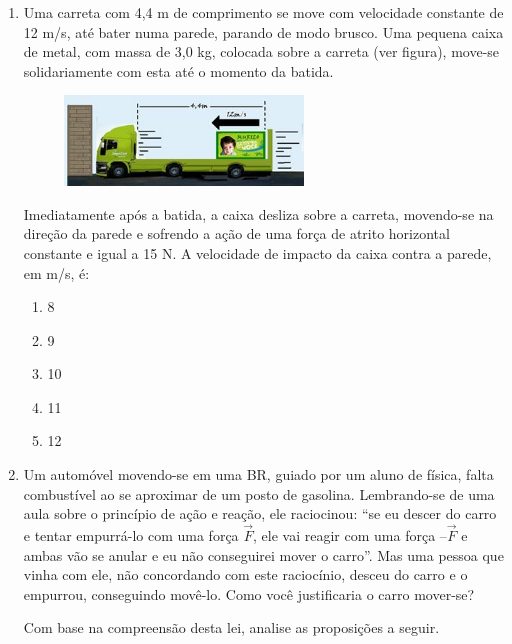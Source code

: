 \documentclass[12pt,letterpaper,fleqn]{article}
\begin{document}
\begin{enumerate}
\item Uma carreta com 4,4 m de comprimento se move com velocidade constante de 12 m/s, até bater numa parede,
parando de modo brusco. Uma pequena caixa de metal, com massa de 3,0 kg, colocada sobre a carreta (ver figura), move-se solidariamente com esta até o momento da batida.

\begin{figure}[h]
    \centering
    \includegraphics[width=0.6\textwidth]{ex_10.jpg}
\end{figure}

Imediatamente após a batida, a caixa desliza sobre a carreta, movendo-se na direção da parede e sofrendo a ação de uma força de atrito horizontal constante e igual a 15 N. A velocidade de impacto da caixa contra a parede, em m/s, é:
\begin{enumerate}
    \item 8
    \item 9
    \item 10
    \item 11
    \item 12
\end{enumerate}

\item Um automóvel movendo-se em uma BR, guiado por um aluno de física, falta combustível ao se aproximar de um posto de gasolina. Lembrando-se de uma aula sobre o princípio de ação e reação, ele raciocinou: “se eu descer do carro e tentar empurrá-lo com uma força $\Vec{F}$, ele vai reagir com uma força –$\Vec{F}$ e ambas vão se anular e eu não conseguirei mover o carro”. Mas uma pessoa que vinha com ele, não concordando com este raciocínio, desceu do carro e o empurrou, conseguindo movê-lo. Como você justificaria o carro mover-se?

Com base na compreensão desta lei, analise as proposições a seguir.


\end{enumerate}
\end{document}
